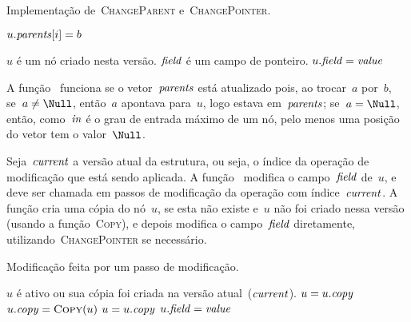 \documentclass[../../main.tex]{subfiles}
\begin{document}
\begin{algorithm}
\caption{Implementação de~\textsc{ChangeParent} e~\textsc{ChangePointer}.} \label{lst:chng_par_ptr}
\begin{algorithmic}[1]

			\State $u.\mathit{parents}[i] = b$
			\State \Break
		\EndIf
	\EndFor
\EndFunction

\Require $u$ é um nó criado nesta versão.
\Require $\mathit{field}$ é um campo de ponteiro.
		\State {}
	\EndIf
	\State $u.\mathit{field} = \mathit{value}$
		\State {}
	\EndIf
\EndFunction

\end{algorithmic}
\end{algorithm}

\newcommand{\cur}{\V{current}}

A função~ funciona se o vetor~$\mathit{parents}$ está atualizado pois, ao trocar~$a$ por~$b$, se~$a \neq \Null$, então~$a$ apontava para~$u$, logo estava em~$\mathit{parents}$; se~$a = \Null$, então, como~$\mathit{in}$ é o grau de entrada máximo de um nó, pelo menos uma posição do vetor tem o valor~$\Null$.

Seja~$\cur$ a versão atual da estrutura, ou seja, o índice da operação de modificação que está sendo aplicada.
A função~ modifica o campo~$\mathit{field}$ de~$u$, e deve ser chamada em passos de modificação da operação com índice~$\cur$. A função cria uma cópia do nó~$u$, se esta não existe e~$u$ não foi criado nessa versão (usando a função~\textsc{Copy}), e depois modifica o campo~$\mathit{field}$ diretamente, utilizando~\textsc{ChangePointer} se necessário.

\begin{algorithm}
\caption{Modificação feita por um passo de modificação.} \label{lst:modify}
\begin{algorithmic}[1]

\Require $u$ é ativo ou sua cópia foi criada na versão atual~($\cur$).
	 \label{line:modify:if1}
		\State $u = u.\mathit{copy}$
	\ElsIf{$u.\V{version} < \cur$} \label{line:modify:if2}
		\State $u.\cp = \Call{Copy}{u}$ \label{line:modify:copy}
		\State $u = u.\mathit{copy}$
	\EndIf
	 \label{line:modify:chngb}
		\State {}
	\Else
		\State $u.\mathit{field} = \mathit{value}$
		\EndIf \label{line:modify:chnge}
\EndFunction

\end{algorithmic}
\end{algorithm}
\end{document}
